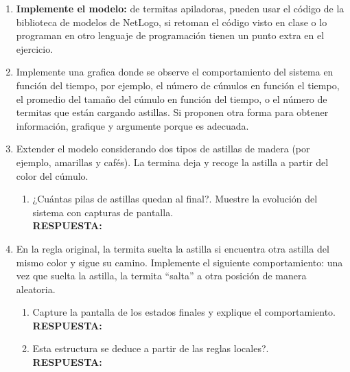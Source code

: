 \documentclass[12pt]{article}
\begin{document}
\begin{enumerate}
    \item \textbf{Implemente el modelo:} de termitas apiladoras, pueden usar el código de la biblioteca de modelos de NetLogo, si retoman el código visto en clase o lo programan en otro lenguaje de
    programación tienen un punto extra en el ejercicio.\\
    \item Implemente una grafica donde se observe el comportamiento del sistema en función del tiempo, por ejemplo, el número de cúmulos en función el tiempo, el promedio del tamaño del
    cúmulo en función del tiempo, o el número de termitas que están cargando astillas. Si proponen otra forma para obtener información, grafique y argumente porque es adecuada.\\
    \item Extender el modelo considerando dos tipos de astillas de madera (por ejemplo, amarillas y cafés). La termina deja y recoge la astilla a partir del color del cúmulo.\\
    \begin{enumerate}
        \item ¿Cuántas pilas de astillas quedan al final?. Muestre la evolución del sistema con capturas de pantalla.\\
        \textbf{\color{red} RESPUESTA:}\\
    \end{enumerate}
    \item En la regla original, la termita suelta la astilla si encuentra otra astilla del mismo color y sigue su camino. Implemente el siguiente comportamiento: una vez que suelta la astilla, la
    termita “salta” a otra posición de manera aleatoria.\\
    \begin{enumerate}
        \item Capture la pantalla de los estados finales y explique el comportamiento.\\
        \textbf{\color{red} RESPUESTA:}\\
        \item Esta estructura se deduce a partir de las reglas locales?.\\
        \textbf{\color{red} RESPUESTA:}\\
    \end{enumerate}
    
\end{enumerate}
\end{document}

